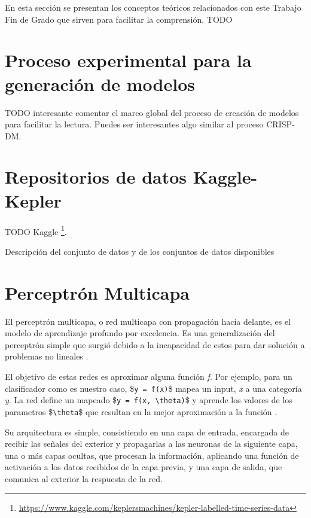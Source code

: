 
En esta sección se presentan los conceptos teóricos relacionados con este Trabajo Fin de Grado que  sirven para facilitar la comprensión. TODO


\section{Proceso experimental para la generación de modelos}
TODO interesante  comentar el marco global del proceso de creación de modelos para facilitar la lectura. Puedes ser interesantes algo similar al proceso CRISP-DM.


\section{Repositorios de datos Kaggle-Kepler}

TODO Kaggle \footnote{ \url{https://www.kaggle.com/keplersmachines/kepler-labelled-time-series-data}}.

Descripción del conjunto de datos y de los conjuntos de datos disponibles


\section{Perceptrón Multicapa}\label{perceptron-multicapa}

El perceptrón multicapa, o red multicapa con propagación hacia delante,
es el modelo de aprendizaje profundo por excelencia. Es una
generalización del perceptrón simple que surgió debido a la incapacidad
de estos para dar solución a problemas no lineales \cite{Minsky-1969}.

El objetivo de estas redes es aproximar alguna función \emph{f}. Por
ejemplo, para un clasificador como es nuestro caso,
\$\texttt{y = f(x)}\$ mapea un input, \emph{x} a una categoría \emph{y}.
La red define un mapeado \$\texttt{y = f(x, \textbackslash{}theta)}\$ y
aprende los valores de los parametros \$\texttt{\textbackslash{}theta}\$
que resultan en la mejor aproximación a la función \cite{Goodfellow-et-al-2016}.

Su arquitectura es simple, consistiendo en una capa de entrada,
encargada de recibir las señales del exterior y propagarlas a las
neuronas de la siguiente capa, una o más capas ocultas, que procesan la
información, aplicando una función de activación a los datos recibidos
de la capa previa, y una capa de salida, que comunica al exterior la
respuesta de la red.

